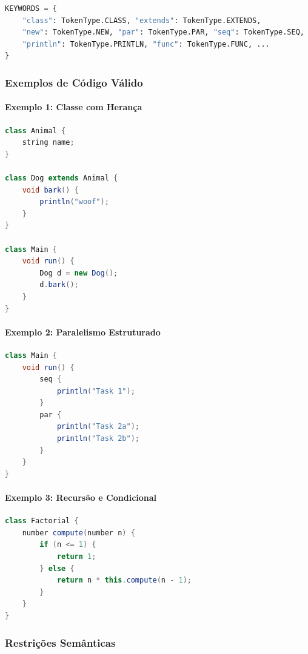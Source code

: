 \documentclass[12pt]{article}
\begin{document}
\begin{lstlisting}[language=Python,caption={Mapeamento KEYWORDS (trecho lexer.py)}]
KEYWORDS = {
    "class": TokenType.CLASS, "extends": TokenType.EXTENDS,
    "new": TokenType.NEW, "par": TokenType.PAR, "seq": TokenType.SEQ,
    "println": TokenType.PRINTLN, "func": TokenType.FUNC, ...
}
\end{lstlisting}

\subsubsection{Exemplos de Código Válido}

\paragraph{Exemplo 1: Classe com Herança}
\begin{lstlisting}[language=Java, caption={Herança OO em MiniPar 2026.1}]
class Animal {
    string name;
}

class Dog extends Animal {
    void bark() {
        println("woof");
    }
}

class Main {
    void run() {
        Dog d = new Dog();
        d.bark();
    }
}
\end{lstlisting}

\paragraph{Exemplo 2: Paralelismo Estruturado}
\begin{lstlisting}[language=Java, caption={Blocos \texttt{par} e \texttt{seq}}]
class Main {
    void run() {
        seq {
            println("Task 1");
        }
        par {
            println("Task 2a");
            println("Task 2b");
        }
    }
}
\end{lstlisting}

\paragraph{Exemplo 3: Recursão e Condicional}
\begin{lstlisting}[language=Java, caption={Recursão (Fatorial)}]
class Factorial {
    number compute(number n) {
        if (n <= 1) {
            return 1;
        } else {
            return n * this.compute(n - 1);
        }
    }
}
\end{lstlisting}

\subsubsection{Restrições Semânticas}
\end{document}
